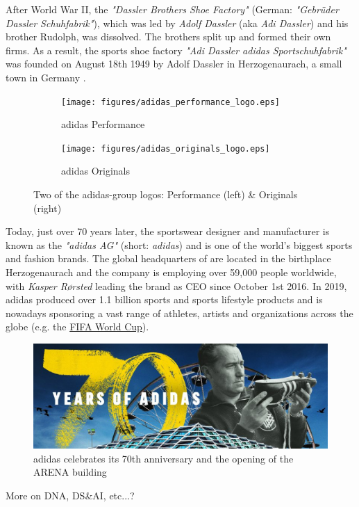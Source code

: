 

After World War II, the \textit{"Dassler Brothers Shoe Factory"} (German: \textit{"Gebrüder Dassler Schuhfabrik"}), which was led by \textit{Adolf Dassler} (aka \textit{Adi Dassler}) and his brother Rudolph, was dissolved. The brothers split up and formed their own firms. As a result, the sports shoe factory \textit{"Adi Dassler adidas Sportschuhfabrik"} was founded on August 18th 1949 by Adolf Dassler in Herzogenaurach, a small town in Germany \citep{adidas-group}. \\

\begin{figure}[H]
\centering
\begin{subfigure}{.4\textwidth}
  \centering
  \texttt{[image: figures/adidas\_performance\_logo.eps]}
  \caption{adidas Performance}
  \label{fig:adidas_performance_logo}
\end{subfigure}
\begin{subfigure}{.4\textwidth}
  \centering
  \texttt{[image: figures/adidas\_originals\_logo.eps]}
  \caption{adidas Originals}
  \label{fig:adidas_originals_logo}
\end{subfigure}
\caption{Two of the adidas-group logos: Performance (left) \& Originals (right) \\ \citep{adidasmediacenter}}
\label{fig:adidas_logos}
\end{figure} 


Today, just over 70 years later, the sportswear designer and manufacturer is known as the \textit{"adidas AG"} (short: \textit{adidas}) and is one of the world's biggest sports and fashion brands. The global headquarters of are located in the birthplace Herzogenaurach and the company is employing over 59,000 people worldwide, with \textit{Kasper R\o rsted} leading the brand as CEO since October 1st 2016. In 2019, adidas produced over 1.1 billion sports and sports lifestyle products and is nowadays sponsoring a vast range of athletes, artists and organizations across the globe (e.g. the  \href{https://www.fifa.com/worldcup/}{FIFA World Cup\texttrademark}).\\

\begin{figure}[H]
\centering
  \includegraphics[width=.95\linewidth]{figures/adidas_70_years.eps}
  \caption{adidas celebrates its 70th anniversary and the opening of the ARENA building \citep{adidas70years}}
  \label{fig:adidas_70_years}
\end{figure}


More on  DNA, DS\&AI, etc...?